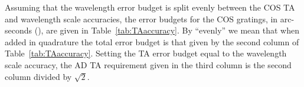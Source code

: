 Assuming that the wavelength error budget is split evenly between the COS TA and wavelength scale accuracies,
the error budgets for the COS gratings, in arc-seconds (\arcsec), are given in Table~\ref{tab:TAaccuracy}. By ``evenly'' we mean that when added in quadrature the total error budget is that given by the second column of Table~\ref{tab:TAaccuracy}.
Setting the TA error budget equal to the wavelength scale accuracy, the AD TA requirement given in the third column is the second column divided by $\sqrt{2}$.
